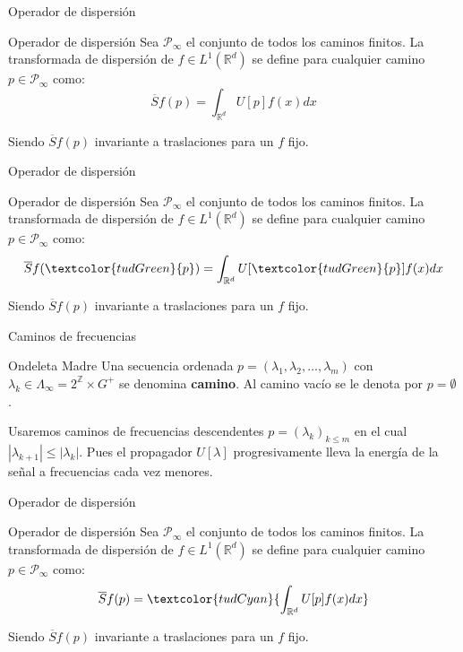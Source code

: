 \documentclass[aspectratio=43]{beamer}
\begin{document}
\begin{frame}{Operador de dispersión}
  \begin{alertblock}{Operador de dispersión}
    Sea $\mathcal{P}_\infty$ el conjunto de todos los caminos finitos. La transformada de dispersión de $f \in L^1(\mathbb{R}^d)$ se define para cualquier camino $p \in \mathcal{P}_\infty$ como:
    \begin{equation}
      \overline{S}f(p)=\int_{\mathbb{R}^d}U[p]f(x)dx 
    \end{equation}
  \end{alertblock}

  Siendo $\overline{S}f(p)$ invariante a traslaciones para un $f$ fijo.
\end{frame}


\begin{frame}{Operador de dispersión}
  \begin{alertblock}{Operador de dispersión}
    Sea \textcolor{tudGreen}{$\mathcal{P}_\infty$} el conjunto de todos los caminos finitos. La transformada de dispersión de $f \in L^1(\mathbb{R}^d)$ se define para cualquier camino \textcolor{tudGreen}{$p \in \mathcal{P}_\infty$} como:
    \begin{equation}
      \overline{S}f(\textcolor{tudGreen}{p})=\int_{\mathbb{R}^d}U[\textcolor{tudGreen}{p}]f(x)dx 
    \end{equation}
  \end{alertblock}
  
  Siendo $\overline{S}f(p)$ invariante a traslaciones para un $f$ fijo.
\end{frame}

\begin{frame}{Caminos de frecuencias}
  \begin{block}{Ondeleta Madre}
    Una secuencia ordenada $p=(\lambda_1,\lambda_2, \ldots , \lambda_m)$ con $\lambda_k \in \Lambda_\infty=2^{\mathbb{Z}} \times G^{+} $ se denomina \textbf{camino}. Al camino vacío se le denota por $p=\emptyset$. 
  \end{block}
  
  Usaremos caminos de frecuencias descendentes $p=(\lambda_k)_{k\leq m}$ en el cual $|\lambda_{k+1}| \leq |\lambda_k|$. Pues el propagador $U[\lambda]$ progresivamente lleva la energía de la señal a frecuencias cada vez menores.
\end{frame}

\begin{frame}{Operador de dispersión}
  \begin{alertblock}{Operador de dispersión}
    Sea $\mathcal{P}_\infty$ el conjunto de todos los caminos finitos. La transformada de dispersión de $f \in L^1(\mathbb{R}^d)$ se define para cualquier camino $p \in \mathcal{P}_\infty$ como:
    \begin{equation}
      \overline{S}f(p)=\textcolor{tudCyan}{\int_{\mathbb{R}^d}U[p]f(x)dx} 
    \end{equation}
  \end{alertblock}

  Siendo $\overline{S}f(p)$ invariante a traslaciones para un $f$ fijo.
\end{frame}
\end{document}
